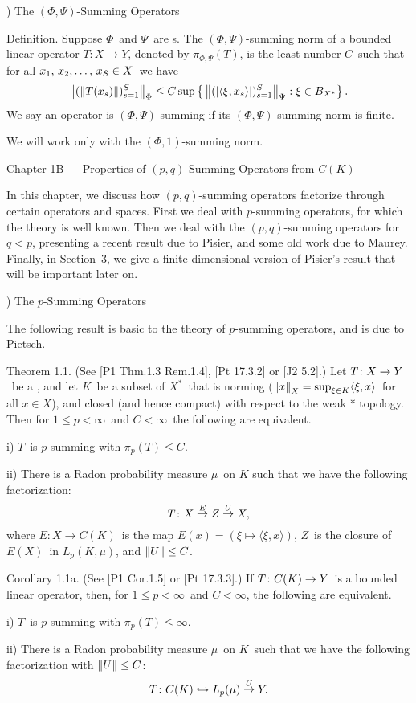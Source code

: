) The $(\Phi,\Psi)$-Summing Operators
 
\proclaim Definition. Suppose $\Phi$\ and $\Psi$\ are \nqOf s. The
{\dt $(\Phi,\Psi)$-summing norm} of a bounded linear operator $T\colon
X\to Y$,
denoted by $\pi_{\Phi,\Psi}(T)$, is the least number $C$\ such that
for all
$\xS\in X$\ we have
$$ \left\| (\left\| T(x_s) \right\|)_{s=1}^S \right\|_\Phi \le
   C \sup \left\{\, \left\|  (\left|\langle \xi,x_s \rangle\right|)_{s=1}^S
 \right\|_\Psi
   : \xi\in B_{X^*} \right\}. $$
We say an operator is {\dt $(\Phi,\Psi)$-summing} if its $(\Phi,\Psi)$-summing
norm is finite.
 
We will work only with the $(\Phi,1)$-summing norm.
 
\vfill
\eject
 
\beginsection Chapter 1B --- Properties of $(p,q)$-Summing Operators
from
$C(K)$
 
In this chapter, we discuss how $(p,q)$-summing operators factorize
through
certain operators and spaces. First we deal with $p$-summing operators,
for
which the theory is well known. Then we deal with the $(p,q)$-summing
operators
for $q<p$, presenting a recent result due to Pisier, and some old
work due to
Maurey. Finally, in Section~3, we give a finite dimensional version
of Pisier's
result that will be important later on.
 
) The $p$-Summing Operators
 
The following result is basic to the theory of $p$-summing operators,
and is
due to Pietsch.
 
\proclaim Theorem 1.1. (See [P1 Thm.1.3 Rem.1.4], [Pt 17.3.2] or
[J2
5.2].)
Let $T\colon X\to Y$\ be a \blobBs, and let $K$\ be a
subset of $X^*$\ that is norming ($\left\| x \right\|_X = \sup_{\xi\in K}\langle
\xi,x
\rangle$\ for all $x\in X$), and closed (and hence compact) with
respect to the
weak * topology. Then for $1\le p<\infty$\ and $C<\infty$\ the following
are
equivalent.
\item{i)} $T$\ is $p$-summing with $\pi_p(T)\le C$.
\item{ii)} There is a Radon probability measure $\mu$\ on $K$ such
that we have
the following factorization:
$$ T\colon X\mathrel{\mathop\to^E} Z \mathrel{\mathop\to^U} X,$$
where $E\colon X\to C(K)$\ is the map $E(x)=(\xi\mapsto\langle
\xi,x \rangle)$, $Z$\ is the closure of $E(X)$\ in $L_p(K,\mu)$,
and
$\left\| U \right\| \le C$.
\endit
 
\proclaim Corollary 1.1a. (See [P1 Cor.1.5] or [Pt 17.3.3].)
If $T\colon C(K)\to Y$\ is a bounded linear operator, then, for
$1\le p<\infty$\ and $C<\infty$, the following are equivalent.
\item{i)} $T$\ is $p$-summing with $\pi_p(T)\le\infty$.
\item{ii)} There is a Radon probability measure $\mu$\ on $K$\ such
that we
have the following factorization with $\left\| U \right\|\le C$:
$$ T\colon C(K) \hookrightarrow L_p(\mu) \mathrel{\mathop\to^U} Y.$$
 
